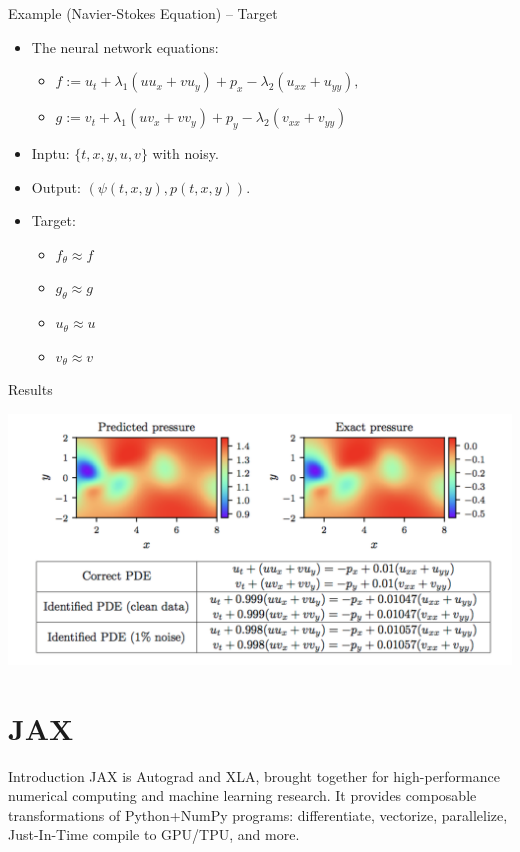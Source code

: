 \documentclass[aspectratio=1610,xcolor={dvipsnames},hyperref={colorlinks,unicode,linkcolor=violet,anchorcolor=BlueViolet,citecolor=YellowOrange,filecolor=black,urlcolor=Aquamarine}]{beamer}
\begin{document}
\begin{frame}[label={sec:org8c3953f}]{Example (Navier-Stokes Equation) -- Target}
\begin{itemize}
\item The neural network equations:
\begin{itemize}
\item \(f := u_t + \lambda_1 (u u_x + v u_y) + p_x - \lambda_2(u_{xx} + u_{yy}),\)
\item \(g := v_t + \lambda_1 (u v_x + v v_y) + p_y - \lambda_2(v_{xx} + v_{yy})\)
\end{itemize}
\item Inptu: \(\{t,x,y,u,v\}\) with noisy.
\item Output: \((\psi(t, x, y), p(t, x, y))\).
\item Target:
\begin{itemize}
\item \(f_{\theta} \approx f\)
\item \(g_{\theta} \approx g\)
\item \(u_{\theta} \approx u\)
\item \(v_{\theta} \approx v\)
\end{itemize}
\end{itemize}
\end{frame}

\begin{frame}[label={sec:org24e4e26}]{Results}
\begin{center}
\includegraphics[width=.9\linewidth]{./p9.png}
\end{center}
\end{frame}

\section{JAX}
\label{sec:org9898778}

\begin{frame}[label={sec:orgb2cd3e4}]{Introduction}
JAX is Autograd and XLA, brought together for high-performance
numerical computing and machine learning research. It provides
composable transformations of Python+NumPy programs: differentiate,
vectorize, parallelize, Just-In-Time compile to GPU/TPU, and more.
\end{frame}
\end{document}
